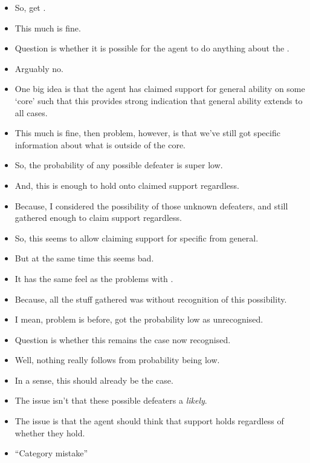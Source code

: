 \begin{note}
  \large
  \begin{itemize}
  \item So, get \requ{}.
  \item This much is fine.
  \item Question is whether it is possible for the agent to do anything about the \requ{}.
  \item Arguably no.
  \item One big idea is that the agent has claimed support for general ability on some `core' such that this provides strong indication that general ability extends to all cases.
  \item This much is fine, then problem, however, is that we've still got specific information about what is outside of the core.
  \item So, the probability of any possible defeater is super low.
  \item And, this is enough to hold onto claimed support regardless.
  \item Because, I considered the possibility of those unknown defeaters, and still gathered enough to claim support regardless.
  \item So, this seems to allow claiming support for specific from general.
  \item But at the same time this seems bad.
  \item It has the same feel as the problems with .
  \item Because, all the stuff gathered was without recognition of this possibility.
  \end{itemize}

  \begin{itemize}
  \item I mean, problem is before, got the probability low as unrecognised.
  \item Question is whether this remains the case now recognised.
  \item Well, nothing really follows from probability being low.
  \item In a sense, this should already be the case.
  \item The issue isn't that these possible defeaters a \emph{likely}.
  \item The issue is that the agent should think that support holds regardless of whether they hold.
  \item ``Category mistake''
  \end{itemize}


\end{note}
